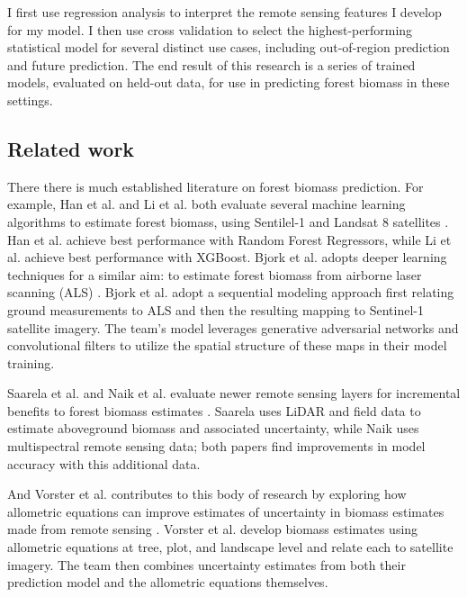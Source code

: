 \documentclass{article}
\begin{document}
I first use regression analysis to interpret the remote sensing features I develop for my model. I then use  cross validation to select the highest-performing statistical model for several distinct use cases, including out-of-region prediction and future prediction. The end result of this research is a series of trained models, evaluated on held-out data, for use in predicting forest biomass in these settings.

\subsection{Related work}

There there is much established literature on forest biomass prediction. For example, Han et al. and Li et al. both evaluate several machine learning algorithms to estimate forest biomass, using Sentilel-1 and Landsat 8 satellites \cite{Han_2022, Li_2020}. Han et al. achieve best performance with Random Forest Regressors, while Li et al. achieve best performance with XGBoost. Bjork et al. adopts deeper learning techniques for a similar aim: to estimate forest biomass from airborne laser scanning (ALS) \cite{Bjork_2021}. Bjork et al. adopt a sequential modeling approach first relating ground measurements to ALS and then the resulting mapping to Sentinel-1 satellite imagery. The team's model leverages generative adversarial networks and convolutional filters to utilize the spatial structure of these maps in their model training. 

Saarela et al. and Naik et al. evaluate newer remote sensing layers for incremental benefits to forest biomass estimates \cite{Saarela_2020, Naik_2021}. Saarela uses LiDAR and field data to estimate aboveground biomass and associated uncertainty, while Naik uses multispectral remote sensing data; both papers find improvements in model accuracy with this additional data.

And Vorster et al. contributes to this body of research by exploring how allometric equations can improve estimates of uncertainty in biomass estimates made from remote sensing \cite{Vorster_2020}. Vorster et al. develop biomass estimates using allometric equations at tree, plot, and landscape level and relate each to satellite imagery. The team then combines uncertainty estimates from both their prediction model and the allometric equations themselves. 

\end{document}
